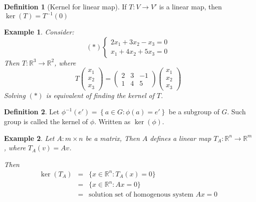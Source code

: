 \documentclass{article}
\theoremstyle{MyNonumberplain}
\theoremstyle{break}
\newcommand{\p}{\phi}
\theoremstyle{break}
\newtheorem{example}{Example}[section]
\theoremstyle{break}
\theoremstyle{definition}
\theoremstyle{break}
\newtheorem{definition}{Definition}[section]
\begin{document}
\begin{defbox}
    \begin{definition}[Kernel for linear map]
        If $T : V \rightarrow V'$ is a linear map, then $\ker (T) = T^{- 1} (0)$
    \end{definition}
\end{defbox}

\begin{expbox}
    \begin{example}
        Consider:
\[ (\ast) \left\{\begin{array}{l}
     2 x_1 + 3 x_2 - x_3 = 0\\
     x_1 + 4 x_2 + 5 x_3 = 0
   \end{array}\right. \]
Then $T : \mathbb{R}^3 \rightarrow \mathbb{R}^2$, where
\[ T \left(\begin{array}{c}
     x_1\\
     x_2\\
     x_3
   \end{array}\right) = \left(\begin{array}{ccc}
     2 & 3 & - 1\\
     1 & 4 & 5
   \end{array}\right) \left(\begin{array}{c}
     x_1\\
     x_2\\
     x_3
   \end{array}\right) \]
Solving $(\ast)$ is equivalent of finding the kernel of $T$. 
    \end{example}
\end{expbox}

\begin{defbox}
    \begin{definition}
        Let $\p^{- 1} (e') = \left\{ a \in G : \p (a) = e' \right\}$ be a subgroup of
        $G$. Such group is called the kernel of $\p$. Written as $\ker \left(
        \p \right)$.
    \end{definition}
\end{defbox}

\begin{expbox}
    \begin{example}
        Let $A : m \times n$ be a matrix, Then $A$ defines a linear map $T_A :
        \mathbb{R}^n \rightarrow \mathbb{R}^m$, where $T_A (v) = A v$.

        Then
        \begin{eqnarray*}
        \ker (T_A) & = & \{ x \in \mathbb{R}^n : T_A (x) = 0 \}\\
        & = & \{ x \in \mathbb{R}^n : A x = 0 \}\\
        & = & \text{solution set of homogenous system $A x = 0$}
        \end{eqnarray*}
    \end{example}
\end{expbox}
\end{document}
